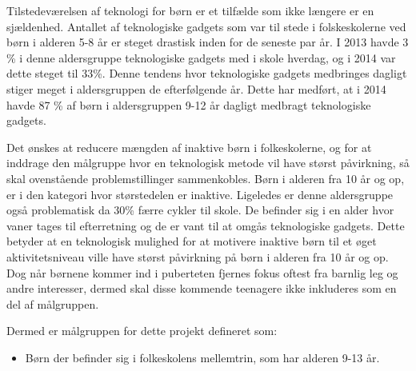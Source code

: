 Tilstedeværelsen af teknologi for børn er et tilfælde som ikke længere er en sjældenhed. Antallet af teknologiske gadgets som var til stede i folskeskolerne ved børn i alderen 5-8 år er steget drastisk inden for de seneste par år. I 2013 havde 3 \% i denne aldersgruppe teknologiske gadgets med i skole hverdag, og i 2014 var dette steget til 33\%. Denne tendens hvor teknologiske gadgets medbringes dagligt stiger meget i aldersgruppen de efterfølgende år. Dette har medført, at i 2014 havde 87 \% af børn i aldersgruppen 9-12 år dagligt medbragt teknologiske gadgets. \citep{GjensidigeForsikring2014}

Det ønskes at reducere mængden af inaktive børn i folkeskolerne, og for at inddrage den målgruppe hvor en teknologisk metode vil have størst påvirkning, så skal ovenstående problemstillinger sammenkobles. Børn i alderen fra 10 år og op, er i den kategori hvor størstedelen er inaktive. Ligeledes er denne aldersgruppe også problematisk da 30\% færre cykler til skole. De befinder sig i en alder hvor vaner tages til efterretning og de er vant til at omgås teknologiske gadgets. Dette betyder at en teknologisk mulighed for at motivere inaktive børn til et øget aktivitetsniveau ville have størst påvirkning på børn i alderen fra 10 år og op. Dog når børnene kommer ind i puberteten fjernes fokus oftest fra barnlig leg og andre interesser, dermed skal disse kommende teenagere ikke inkluderes som en del af målgruppen. 

Dermed er målgruppen for dette projekt defineret som: 

\begin{itemize}
\item Børn der befinder sig i folkeskolens mellemtrin, som har alderen 9-13 år.
\end{itemize}